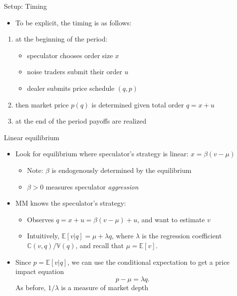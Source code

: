 \documentclass[english,10pt
,aspectratio=169
]{beamer}
\begin{document}
\begin{frame}{Setup: Timing}
	\begin{itemize}
		\item To be explicit, the timing is as follows:
	\end{itemize}
	\begin{enumerate}
		\item at the beginning of the period:
		\begin{itemize}
			\item speculator chooses order size $x$
			\item noise traders submit their order $u$
			\item dealer submits price schedule $(q,p)$
		\end{itemize}
		\item then market price $p(q)$ is determined given total order $q=x+u$
		\item at the end of the period payoffs are realized
	\end{enumerate}
\end{frame}


\begin{frame}{Linear equilibrium}
\begin{itemize}
	\item Look for equilibrium where speculator's strategy is linear: \alert{$x=\beta(v-\mu)$}
	\begin{itemize}
		\item Note: $\beta$ is endogenously determined by the equilibrium
		\item $\beta>0$ measures speculator \textit{aggression}
	\end{itemize}
	\item MM knows the speculator's strategy:
	\begin{itemize}
		\item Observes $q=x+u=\beta(v-\mu)+u$, and want to \alert{estimate $v$}
		\item Intuitively, \alert{$\mathbb{E}[v|q] = \mu + \lambda  q$}, where $\lambda $ is the regression coefficient $\mathbb{C}(v,q)/\mathbb{V}(q)$, and recall that $\mu=\mathbb{E}[v]$.
	\end{itemize}
	\item Since $p=\mathbb{E}[v|q]$, we can use the conditional expectation to get a price impact equation 
	\[
	p-\mu=\lambda q.
	\]
	As before, $1/\lambda$ is a measure of market depth
\end{itemize}
\end{frame}
\end{document}

